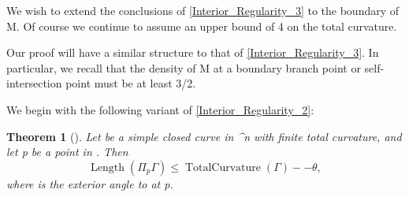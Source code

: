 \documentclass[a4paper, 11pt]{article}
\theoremstyle{plain}
\newtheorem{theorem}{Theorem}[section]
\theoremstyle{definition}
\theoremstyle{remark}
\numberwithin{equation}{subsection}
\def\({}
\def\){}
\def\pi{}
\begin{document}
We wish to extend the conclusions of \cref{Interior_Regularity_3} to the boundary of \(M\). Of course we continue to assume an upper bound of \(4\pi\) on the total curvature.

Our proof will have a similar structure to that of \cref{Interior_Regularity_3}. In particular, we recall that the density of \(M\) at a boundary branch point or self-intersection point must be at least \(3/2\).

We begin with the following variant of \cref{Interior_Regularity_2}:

\begin{theorem}[{\cite[Theorem 3.1]{EWW02}}]
\label{Boundary_Regularity_1}
Let \(\Gamma\) be a simple closed curve in \(^{n}\) with finite total curvature, and let \(p\) be a point in \(\Gamma\). Then
\begin{equation}
\operatorname{Length}(\Pi_{p}\Gamma) \leqslant \operatorname{TotalCurvature}(\Gamma) - \pi - \theta,
\end{equation}
where \(\theta\) is the exterior angle to \(\Gamma\) at \(p\).
\end{theorem}

\begin{comment}  
\begin{proof}
For \(r > 0\) sufficiently small, let \(a_{r}\) and \(b_{r}\) be the intersections of \(\Gamma\) with \(\partial B(p, r)\). Let \(\theta (r)\) be the exterior angle of the triangle \(\triangle a_{r} p b_{r}\) at the vertex \(p\). Let \(q\) be a point sufficiently close to \(p\) such that \(p\) is in the interior of the triangle \(\triangle a_{r} q b_{r}\), but not in the line segments \(\overline{a_{r} q}\) or \(\overline{q b_{r}}\).

We now define a new closed curve \(\Gamma' = \Gamma'_{r,q}\) by replacing \(\Gamma \cap B(p, r)\) with the line segments \(\overline{a_{r} q}\) and \(\overline{q b_{r}}\). Then \(p\) does not lie on \(\Gamma'\), so we may apply \cref{Interior_Regularity_2} to deduce that
\begin{equation}
\operatorname{Length}(\Pi_{p}\Gamma') \leqslant \operatorname{TotalCurvature}(\Gamma')
\end{equation}

Note that \(\Pi_{p}\Gamma'\) consists of \(\Pi_{p}(\Gamma \setminus B(p,r))\) together with a geodesic arc of length \(\pi + \theta(r)\), so
\begin{equation}
\operatorname{Length}(\Pi_{p}(\Gamma \setminus B(p,r))) + \pi + \theta(r) \leqslant \operatorname{TotalCurvature}(\Gamma'_{r,q}).
\end{equation}
We now let \(q \rightarrow p\) to obtain:
\begin{align}
\operatorname{Length}(\Pi_{p}(\Gamma \setminus B(p,r))) + \pi + \theta(r) &\leqslant \operatorname{TotalCurvature}(\Gamma'_{r,p}) \\ &\leqslant \operatorname{TotalCurvature}(\Gamma).
\end{align}

Letting \(r \rightarrow 0\) yields the required result.
\end{proof}
\end{comment}
\end{document}
